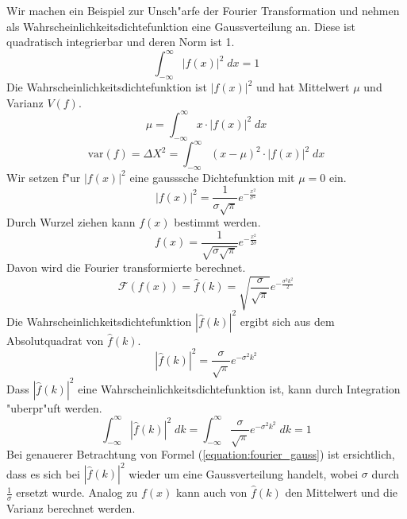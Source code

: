 \begin{refsection}
Wir machen ein Beispiel zur Unsch"arfe der Fourier Transformation und nehmen als Wahrscheinlichkeitsdichtefunktion eine Gaussverteilung an.
Diese ist quadratisch integrierbar und deren Norm ist 1.
\begin{equation}
	\int_{-\infty}^{\infty} |f(x)|^{2} \; dx = 1
\end{equation}
Die Wahrscheinlichkeitsdichtefunktion ist $|f(x)|^{2}$ und hat Mittelwert $\mu$ und Varianz $V(f)$.
\begin{equation}
	\mu = \int_{-\infty}^{\infty} x \cdot |f(x)|^{2} \; dx
\end{equation}
\begin{equation}	
	\text{var}(f) = \varDelta X^{2} = \int_{-\infty}^{\infty} (x-\mu)^{2} \cdot |f(x)|^{2} \; dx
	\label{equation:varianz1}
\end{equation}
Wir setzen f"ur $|f(x)|^{2}$ eine gausssche Dichtefunktion mit $\mu = 0$ ein.
\begin{equation}
	|f(x)|^{2}  = \dfrac{1}{\sigma \sqrt{\pi}}e^{-\frac{x^{2}}{\sigma^{2}}}
\end{equation}
Durch Wurzel ziehen kann $f(x)$ bestimmt werden.
 \begin{equation}
 	f(x) =\dfrac{1}{\sqrt{\sigma\sqrt{\pi}} }e^{-\frac{x^{2}}{2\sigma}} 
 \end{equation}
Davon wird die Fourier transformierte berechnet.
 \begin{equation}
 	\mathcal{F}(f(x)) = \hat{f}(k) = \sqrt{\dfrac{\sigma}{\sqrt{\pi}} }e^{-\frac{\sigma^{2} k^{2}}{2}}
 \end{equation}
Die Wahrscheinlichkeitsdichtefunktion $|\hat{f}(k)|^{2}$ ergibt sich aus dem Absolutquadrat von $\hat{f}(k)$.
\begin{equation}
	|\hat{f}(k)|^{2} = \dfrac{\sigma}{\sqrt{\pi} }e^{-\sigma^{2} k^{2}}
	\label{equation:fourier_gauss}
\end{equation}
Dass $|\hat{f}(k)|^{2}$ eine Wahrscheinlichkeitsdichtefunktion ist, kann durch Integration "uberpr"uft werden.
\begin{equation}
	\int_{-\infty}^{\infty}  |\hat{f}(k)|^{2} \; dk = \int_{-\infty}^{\infty} \dfrac{\sigma}{\sqrt{\pi} }e^{-\sigma^{2} k^{2}} \; dk = 1
\end{equation}
Bei genauerer Betrachtung von Formel (\ref{equation:fourier_gauss}) ist ersichtlich, dass es sich bei $|\hat{f}(k)|^{2}$ wieder um eine Gaussverteilung handelt, wobei $\sigma$ durch $\frac{1}{\sigma}$ ersetzt wurde.
Analog zu $f(x)$ kann auch von $\hat{f}(k)$ den Mittelwert und die Varianz berechnet werden.

\end{refsection}
